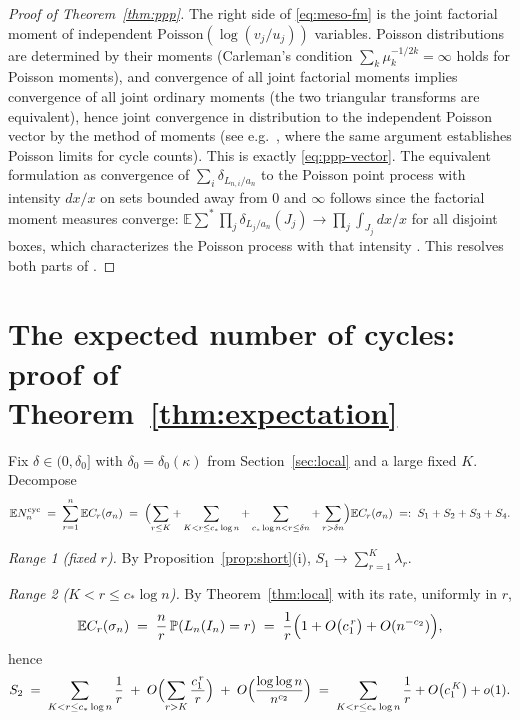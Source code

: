 \documentclass[11pt]{article}
\newcommand{\E}{\mathbb{E}}
\newcommand{\Prob}{\mathbb{P}}
\newcommand{\1}{\mathbf{1}}
\newcommand{\cyc}{\mathrm{cyc}}
\newcommand{\Poisson}{\mathrm{Poisson}}
\theoremstyle{remark}
\begin{document}
\begin{proof}[Proof of Theorem~\ref{thm:ppp}]
The right side of \eqref{eq:meso-fm} is the joint factorial moment of
independent $\Poisson(\log(v_j/u_j))$ variables. Poisson distributions are
determined by their moments (Carleman's condition
$\sum_k\mu_k^{-1/2k}=\infty$ holds for Poisson moments), and convergence of
all joint factorial moments implies convergence of all joint ordinary
moments (the two triangular transforms are equivalent), hence joint
convergence in distribution to the independent Poisson vector by the method
of moments (see e.g.\ \cite{BHJ92}, where the same argument establishes
Poisson limits for cycle counts). This is exactly
\eqref{eq:ppp-vector}. The equivalent formulation as convergence of
$\sum_i\delta_{L_{n,i}/a_n}$ to the Poisson point process with intensity
$dx/x$ on sets bounded away from $0$ and $\infty$ follows since the
factorial moment measures converge:
$\E\sum^*\prod_j\delta_{L_j/a_n}(J_j)\to\prod_j\int_{J_j}dx/x$ for all
disjoint boxes, which characterizes the Poisson process with that intensity
\cite{ABT92,Pit06}. This resolves both parts of
\cite[Conjecture~13.1]{Lon26}.
\end{proof}

\section{The expected number of cycles: proof of Theorem~\ref{thm:expectation}}\label{sec:expectation}

Fix $\delta\in(0,\delta_0]$ with $\delta_0=\delta_0(\kappa)$ from
Section~\ref{sec:local} and a large fixed $K$. Decompose
\begin{equation}\label{eq:four-ranges}
\E N_n^{\cyc}\;=\;\sum_{r=1}^n \E C_r(\sigma_n)
\;=\;\Bigl(\sum_{r\le K}+\sum_{K<r\le c_*\log n}
+\sum_{c_*\log n<r\le\delta n}+\sum_{r>\delta n}\Bigr)\E C_r(\sigma_n)
\;=:\;S_1+S_2+S_3+S_4.
\end{equation}

\emph{Range 1 (fixed $r$).} By Proposition~\ref{prop:short}(i),
$S_1\to\sum_{r=1}^K\lambda_r$.

\emph{Range 2 ($K<r\le c_*\log n$).} By Theorem~\ref{thm:local} with its
rate, uniformly in $r$,
\[
\E C_r(\sigma_n)\;=\;\frac{n}{r}\,\Prob(L_n(I_n)=r)
\;=\;\frac1r\Bigl(1+O\bigl(c_1^{\,r}\bigr)+O(n^{-c_2})\Bigr),
\]
hence
\[
S_2\;=\;\sum_{K<r\le c_*\log n}\frac1r
\;+\;O\Bigl(\sum_{r>K}\frac{c_1^{\,r}}{r}\Bigr)
\;+\;O\Bigl(\frac{\log\log n}{n^{c_2}}\Bigr)
\;=\;\sum_{K<r\le c_*\log n}\frac1r+O\bigl(c_1^{\,K}\bigr)+o(1).
\]
\end{document}
